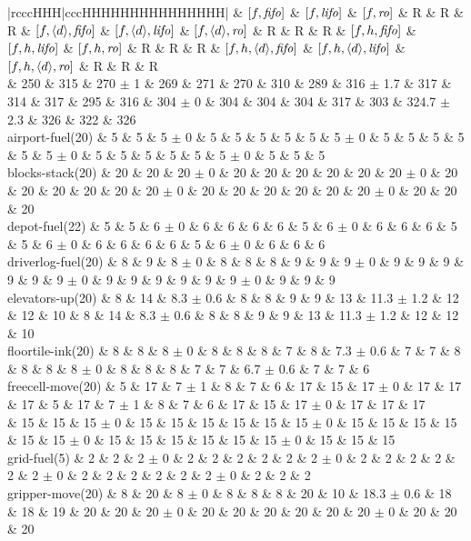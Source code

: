 \begin{center}
\begin{tabular}{|rcccHHH|cccHHHHHHHHHHHHHHH|}
 & $[f,{\text{\textit{fifo}}}]$ & $[f,{\text{\textit{lifo}}}]$ & $[f,{\text{\textit{ro}}}]$ & R & R & R & $[f,{\left<d\right>},{\text{\textit{fifo}}}]$ & $[f,{\left<d\right>},{\text{\textit{lifo}}}]$ & $[f,{\left<d\right>},{\text{\textit{ro}}}]$ & R & R & R & $[f,h,{\text{\textit{fifo}}}]$ & $[f,h,{\text{\textit{lifo}}}]$ & $[f,h,{\text{\textit{ro}}}]$ & R & R & R & $[f,h,{\left<d\right>},{\text{\textit{fifo}}}]$ & $[f,h,{\left<d\right>},{\text{\textit{lifo}}}]$ & $[f,h,{\left<d\right>},{\text{\textit{ro}}}]$ & R & R & R\\
\hline
 & 250 & 315 & 270 $\pm$ 1 & 269 & 271 & 270 & 310 & 289 & 316 $\pm$ 1.7 & 317 & 314 & 317 & 295 & 316 & 304 $\pm$ 0 & 304 & 304 & 304 & 317 & 303 & 324.7 $\pm$ 2.3 & 326 & 322 & 326\\
\hline
airport-fuel(20) & 5 & 5 & 5 $\pm$ 0 & 5 & 5 & 5 & 5 & 5 & 5 $\pm$ 0 & 5 & 5 & 5 & 5 & 5 & 5 $\pm$ 0 & 5 & 5 & 5 & 5 & 5 & 5 $\pm$ 0 & 5 & 5 & 5\\
blocks-stack(20) & 20 & 20 & 20 $\pm$ 0 & 20 & 20 & 20 & 20 & 20 & 20 $\pm$ 0 & 20 & 20 & 20 & 20 & 20 & 20 $\pm$ 0 & 20 & 20 & 20 & 20 & 20 & 20 $\pm$ 0 & 20 & 20 & 20\\
depot-fuel(22) & 5 & 5 & 6 $\pm$ 0 & 6 & 6 & 6 & 6 & 5 & 6 $\pm$ 0 & 6 & 6 & 6 & 5 & 5 & 6 $\pm$ 0 & 6 & 6 & 6 & 6 & 5 & 6 $\pm$ 0 & 6 & 6 & 6\\
driverlog-fuel(20) & 8 & 9 & 8 $\pm$ 0 & 8 & 8 & 8 & 9 & 9 & 9 $\pm$ 0 & 9 & 9 & 9 & 9 & 9 & 9 $\pm$ 0 & 9 & 9 & 9 & 9 & 9 & 9 $\pm$ 0 & 9 & 9 & 9\\
elevators-up(20) & 8 & 14 & 8.3 $\pm$ 0.6 & 8 & 8 & 9 & 9 & 13 & 11.3 $\pm$ 1.2 & 12 & 12 & 10 & 8 & 14 & 8.3 $\pm$ 0.6 & 8 & 8 & 9 & 9 & 13 & 11.3 $\pm$ 1.2 & 12 & 12 & 10\\
floortile-ink(20) & 8 & 8 & 8 $\pm$ 0 & 8 & 8 & 8 & 7 & 8 & 7.3 $\pm$ 0.6 & 7 & 7 & 8 & 8 & 8 & 8 $\pm$ 0 & 8 & 8 & 8 & 7 & 7 & 6.7 $\pm$ 0.6 & 7 & 7 & 6\\
freecell-move(20) & 5 & 17 & 7 $\pm$ 1 & 8 & 7 & 6 & 17 & 15 & 17 $\pm$ 0 & 17 & 17 & 17 & 5 & 17 & 7 $\pm$ 1 & 8 & 7 & 6 & 17 & 15 & 17 $\pm$ 0 & 17 & 17 & 17\\
 & 15 & 15 & 15 $\pm$ 0 & 15 & 15 & 15 & 15 & 15 & 15 $\pm$ 0 & 15 & 15 & 15 & 15 & 15 & 15 $\pm$ 0 & 15 & 15 & 15 & 15 & 15 & 15 $\pm$ 0 & 15 & 15 & 15\\
grid-fuel(5) & 2 & 2 & 2 $\pm$ 0 & 2 & 2 & 2 & 2 & 2 & 2 $\pm$ 0 & 2 & 2 & 2 & 2 & 2 & 2 $\pm$ 0 & 2 & 2 & 2 & 2 & 2 & 2 $\pm$ 0 & 2 & 2 & 2\\
gripper-move(20) & 8 & 20 & 8 $\pm$ 0 & 8 & 8 & 8 & 20 & 10 & 18.3 $\pm$ 0.6 & 18 & 18 & 19 & 20 & 20 & 20 $\pm$ 0 & 20 & 20 & 20 & 20 & 20 & 20 $\pm$ 0 & 20 & 20 & 20\\

\end{tabular}
\end{center}
